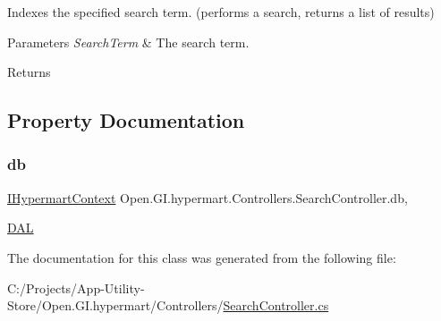Indexes the specified search term. (performs a search, returns a list of results) 


\begin{DoxyParams}{Parameters}
{\em Search\+Term} & The search term.\\
\hline
\end{DoxyParams}
\begin{DoxyReturn}{Returns}

\end{DoxyReturn}


\subsection{Property Documentation}
\hypertarget{class_open_1_1_g_i_1_1hypermart_1_1_controllers_1_1_search_controller_ac0b1c112b3b87593f00d2fd7fe7f1a07}{}\label{class_open_1_1_g_i_1_1hypermart_1_1_controllers_1_1_search_controller_ac0b1c112b3b87593f00d2fd7fe7f1a07} 
\subsubsection{\texorpdfstring{db}{db}}
{\footnotesize\ttfamily \hyperlink{interface_open_1_1_g_i_1_1hypermart_1_1_d_a_l_1_1_i_hypermart_context}{I\+Hypermart\+Context} Open.\+G\+I.\+hypermart.\+Controllers.\+Search\+Controller.\+db\hspace{0.3cm}{\ttfamily [get]}, {\ttfamily [set]}}



\hyperlink{namespace_open_1_1_g_i_1_1hypermart_1_1_d_a_l}{D\+AL} 



The documentation for this class was generated from the following file\+:\begin{DoxyCompactItemize}
\item 
C\+:/\+Projects/\+App-\/\+Utility-\/\+Store/\+Open.\+G\+I.\+hypermart/\+Controllers/\hyperlink{_search_controller_8cs}{Search\+Controller.\+cs}\end{DoxyCompactItemize}
